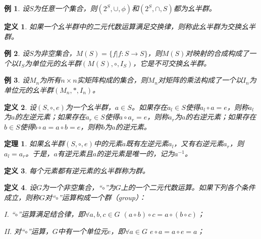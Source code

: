 \documentclass{article}
\newtheorem{Def}{定义}
\newtheorem{Thm}{定理}
\newtheorem*{Example}{例}
\begin{document}
\begin{CJK*}{UTF8}{gbsn}
\begin{Example}
  设$S$为任意一个集合，则$(2^S,\cup,\phi)$和$(2^S,\cap,S)$都为幺半群。
\end{Example}

\begin{Def}
  如果一个幺半群中的二元代数运算满足交换律，则称此幺半群为交换幺半群。
\end{Def}

\begin{Example}
  设$S$为非空集合，$M(S)=\{f|f:S\to S\}$，则$M(S)$对映射的合成构成了一个以$I_S$为单位元的幺半群$(M(S),\circ,I_S)$，它是不可交换幺半群。
\end{Example}
\begin{Example}
  设$M_n$为所有$n\times n$实矩阵构成的集合，则$M_n$对矩阵的乘法构成了一个以$I_n$为单位元的幺半群$(M_n,*,I_n)$。
\end{Example}


\begin{Def}
  设$(S,\circ,e)$为一个幺半群，$a\in S$。如果存在$a_l\in S$使得$a_l\circ a=e$，则称$a_l$为$a$的左逆元素；如果存在$a_r
  \in S$使得$a\circ a_r=e$，则称$a_r$为$a$的右逆元素；如果存在$b\in S$使得$b\circ a=a\circ b=e$，则称$b$为$a$的逆元素。
\end{Def}
\begin{Thm}
  如果幺半群$(S,\circ,e)$中的元素$a$既有左逆元素$a_l$，又有右逆元素$a_r$，则$a_l=a_r$。于是，$a$有逆元素且$a$的逆元素是唯一的，记为$a^{-1}$。
\end{Thm}
\begin{Def}
  每个元素都有逆元素的幺半群称为群。
\end{Def}

\begin{Def}
  设$G$为一个非空集合，“$\circ$”为$G$上的一个二元代数运算。如果下列各个条件成立，则称$G$对“$\circ$”运算构成一个群（group）：

  I. “$\circ$”运算满足结合律，即$\forall a,b,c \in G$ $(a\circ b)\circ c = a\circ(b\circ c)$；

  II. 对“$\circ$”运算，$G$中有一个单位元$e$，即$\forall a\in G$ $e\circ a =a\circ e= a$；


\end{Def}
\end{CJK*}
\end{document}

